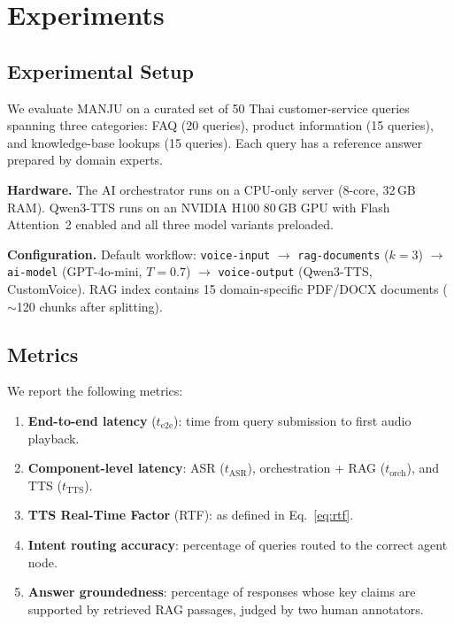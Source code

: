 \documentclass[10pt, a4paper, twocolumn]{article}
\begin{document}
\section{Experiments}
\label{sec:experiments}

\subsection{Experimental Setup}

We evaluate MANJU on a curated set of 50 Thai customer-service queries spanning three categories: FAQ (20 queries), product information (15 queries), and knowledge-base lookups (15 queries).
Each query has a reference answer prepared by domain experts.

\noindent\textbf{Hardware.}
The AI orchestrator runs on a CPU-only server (8-core, 32\,GB RAM).
Qwen3-TTS runs on an NVIDIA H100 80\,GB GPU with Flash Attention~2 enabled and all three model variants preloaded.

\noindent\textbf{Configuration.}
Default workflow: \texttt{voice-input} $\rightarrow$ \texttt{rag-documents} ($k{=}3$) $\rightarrow$ \texttt{ai-model} (GPT-4o-mini, $T{=}0.7$) $\rightarrow$ \texttt{voice-output} (Qwen3-TTS, CustomVoice).
RAG index contains 15 domain-specific PDF/DOCX documents (${\sim}$120 chunks after splitting).

\subsection{Metrics}

We report the following metrics:
\begin{enumerate}[label=(\roman*), nosep]
    \item \textbf{End-to-end latency} ($t_\text{e2e}$): time from query submission to first audio playback.
    \item \textbf{Component-level latency}: ASR ($t_\text{ASR}$), orchestration + RAG ($t_\text{orch}$), and TTS ($t_\text{TTS}$).
    \item \textbf{TTS Real-Time Factor} (RTF): as defined in Eq.~\eqref{eq:rtf}.
    \item \textbf{Intent routing accuracy}: percentage of queries routed to the correct agent node.
    \item \textbf{Answer groundedness}: percentage of responses whose key claims are supported by retrieved RAG passages, judged by two human annotators.
\end{enumerate}
\end{document}
